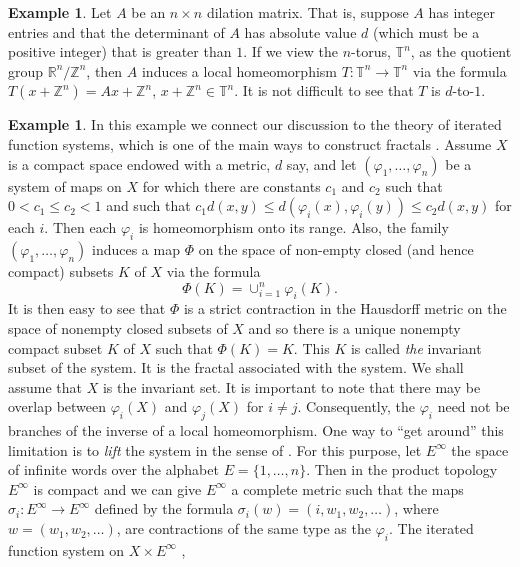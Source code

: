\documentclass{amsproc}
\theoremstyle{plain}
\theoremstyle{definition}
\newtheorem{example}[thm]{Example}
\theoremstyle{definition}
\theoremstyle{remark}
\theoremstyle{plain}
\begin{document}
\begin{example}
Let $A$ be an $n\times n$ dilation matrix. That is, suppose $A$
has integer entries and that the determinant of $A$ has absolute
value $d$ (which must be a positive integer) that is greater than
$1$. If we view the $n$-torus, $\mathbb{T}^{n}$, as the quotient
group $\mathbb{R}^{n}/\mathbb{Z}^{n}$, then $A$ induces a local
homeomorphism $T:\mathbb{T}^{n}\rightarrow\mathbb{T}^{n}$ via the
formula $T(x+\mathbb{Z}^{n})=Ax+\mathbb{Z}^{n}$,
$x+\mathbb{Z}^{n}\in\mathbb{T}^{n}$.
It is not difficult to see that $T$ is $d$-to-$1$. 
\end{example}


\begin{example}
In this example we connect our discussion to the theory of iterated
function systems, which is one of the main ways to construct fractals
\cite{mB88}. Assume $X$ is a compact space endowed with a metric,
$d$ say, and let $(\varphi_{1},\dots,\varphi_{n})$ be a system of
maps on $X$ for which there are constants $c_{1}$ and $c_{2}$ such
that $0<c_{1}\leq c_{2}<1$ and such that $c_{1}d(x,y)\leq
d(\varphi_{i}(x),\varphi_{i}(y))\leq c_{2}d(x,y)$
for each $i$. Then each $\varphi_{i}$ is homeomorphism onto its
range. Also, the family $(\varphi_{1},\dots,\varphi_{n})$ induces
a map $\Phi$ on the space of non-empty closed (and hence compact)
subsets $K$ of $X$ via the formula \[
\Phi(K)=\cup_{i=1}^{n}\varphi_{i}(K).\]
It is then easy to see that $\Phi$ is a strict contraction in the
Hausdorff metric on the space of nonempty closed subsets of $X$ and
so there is a unique nonempty compact subset $K$ of $X$ such that
$\Phi(K)=K$. This $K$ is called \emph{the} invariant subset of the
system. It is the fractal associated with the system. We shall assume
that $X$ is the invariant set. It is important to note that there
may be overlap between $\varphi_{i}(X)$ and $\varphi_{j}(X)$ for
$i\ne j$. Consequently, the $\varphi_{i}$ need not be branches of
the inverse of a local homeomorphism. One way to {}``get around''
this limitation is to \emph{lift} the system in the sense of \cite[Page
155]{mB88}.
For this purpose, let $E^{\infty}$ the space of infinite words over
the alphabet $E=\{1,\dots,n\}$. Then in the product topology $E^{\infty}$
is compact and we can give $E^{\infty}$ a complete metric such that
the maps $\sigma_{i}:E^{\infty}\rightarrow E^{\infty}$ defined by
the formula $\sigma_{i}(w)=(i,w_{1},w_{2},\ldots)$, where
$w=(w_{1},w_{2},\ldots)$,
are contractions of the same type as the $\varphi_{i}$. The iterated
function system on $X\times E^{\infty}$ ,

\end{example}
\end{document}
